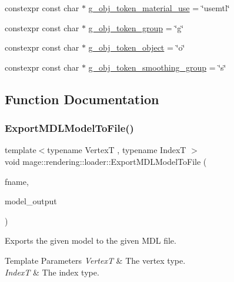 \begin{DoxyCompactItemize}
\item 
constexpr const char $\ast$ \hyperlink{namespacemage_1_1rendering_1_1loader_ac064d06ba84b45092115a1b8d7e0d3b3}{g\+\_\+obj\+\_\+token\+\_\+material\+\_\+use} = \char`\"{}usemtl\char`\"{}
\item 
constexpr const char $\ast$ \hyperlink{namespacemage_1_1rendering_1_1loader_a0357694619e992d57812e2d010c92eaa}{g\+\_\+obj\+\_\+token\+\_\+group} = \char`\"{}g\char`\"{}
\item 
constexpr const char $\ast$ \hyperlink{namespacemage_1_1rendering_1_1loader_a929d4caaeb9cb1dc8b7393d5b9fa1eac}{g\+\_\+obj\+\_\+token\+\_\+object} = \char`\"{}o\char`\"{}
\item 
constexpr const char $\ast$ \hyperlink{namespacemage_1_1rendering_1_1loader_aa2511bf7b71b4c38a061e2f5f36bf195}{g\+\_\+obj\+\_\+token\+\_\+smoothing\+\_\+group} = \char`\"{}s\char`\"{}
\end{DoxyCompactItemize}


\subsection{Function Documentation}
\hypertarget{namespacemage_1_1rendering_1_1loader_a7f18d95a448d41b4879cf887e47a3b2c}{}\label{namespacemage_1_1rendering_1_1loader_a7f18d95a448d41b4879cf887e47a3b2c} 
\subsubsection{\texorpdfstring{Export\+M\+D\+L\+Model\+To\+File()}{ExportMDLModelToFile()}}
{\footnotesize\ttfamily template$<$typename VertexT , typename IndexT $>$ \\
void mage\+::rendering\+::loader\+::\+Export\+M\+D\+L\+Model\+To\+File (\begin{DoxyParamCaption}\item[{const wstring \&}]{fname,  }\item[{const \hyperlink{structmage_1_1rendering_1_1_model_output}{Model\+Output}$<$ VertexT, IndexT $>$ \&}]{model\+\_\+output }\end{DoxyParamCaption})}

Exports the given model to the given M\+DL file.


\begin{DoxyTemplParams}{Template Parameters}
{\em VertexT} & The vertex type. \\
\hline
{\em IndexT} & The index type. \\
\hline
\end{DoxyTemplParams}

